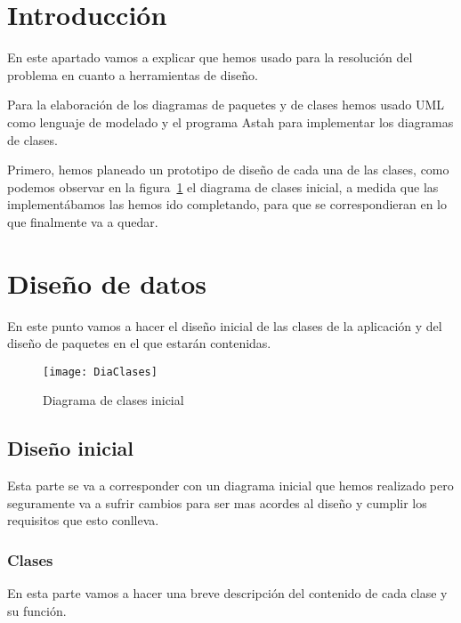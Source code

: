 
\section{Introducción}

En este apartado vamos a explicar que hemos usado para la resolución del problema en cuanto a herramientas de diseño.

Para la elaboración de los diagramas de paquetes y de clases hemos usado UML como lenguaje de modelado y el programa Astah para implementar los diagramas de clases.

Primero, hemos planeado un prototipo de diseño de cada una de las clases, como podemos observar en la figura~\ref{fig:C.1.1} el diagrama de clases inicial, a medida que las implementábamos las hemos ido completando, para que se correspondieran en lo que finalmente va a quedar.



\section{Diseño de datos}

En este punto vamos a hacer el diseño inicial de las clases de la aplicación y del diseño de paquetes en el que estarán contenidas.

\begin{figure}[h]
	\centering
	\texttt{[image: DiaClases]}
	\caption{Diagrama de clases inicial}
	\label{fig:C.1.1}
\end{figure}
 
\subsection{Diseño inicial}
Esta parte se va a corresponder con un diagrama inicial que hemos realizado pero seguramente va a sufrir cambios para ser mas acordes al diseño y cumplir los requisitos que esto conlleva. 
\subsubsection{Clases}
En esta parte vamos a hacer una breve descripción del contenido de cada clase y su función.

